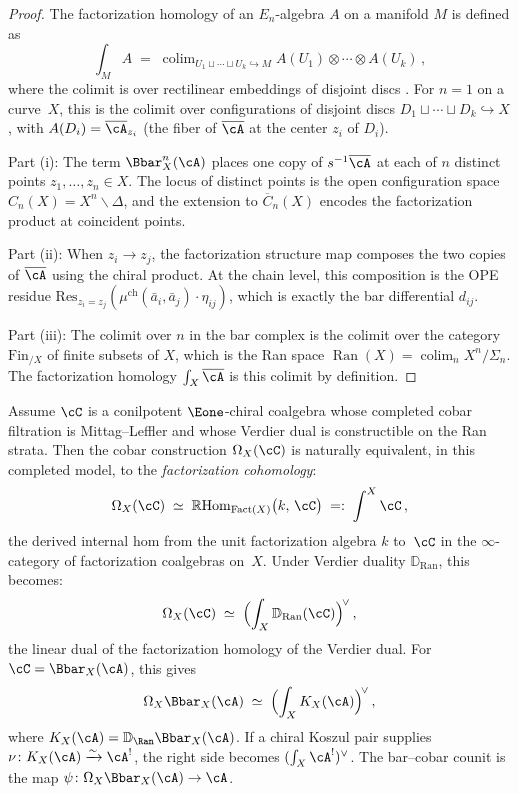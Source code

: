 \begin{proof}
The factorization homology of an $E_n$-algebra $A$ on a manifold
$M$ is defined as
\[
\textstyle\int_M A \;=\; \operatorname{colim}_{U_1 \sqcup \cdots
\sqcup U_k \hookrightarrow M} A(U_1) \otimes \cdots
\otimes A(U_k)\,,
\]
where the colimit is over rectilinear embeddings of disjoint discs
\cite[Definition~3.1]{AF15}. For $n = 1$ on a curve~$X$, this is
the colimit over configurations of disjoint discs
$D_1 \sqcup \cdots \sqcup D_k \hookrightarrow X$, with
$A(D_i) = \overline{\cA}_{z_i}$ (the fiber of $\overline{\cA}$
at the center $z_i$ of $D_i$).

Part (i): The term $\Bbar^n_X(\cA)$ places one copy of
$s^{-1}\overline{\cA}$ at each of $n$ distinct points
$z_1, \ldots, z_n \in X$. The locus of distinct points is the
open configuration space $C_n(X) = X^n \smallsetminus \Delta$,
and the extension to $\overline{C}_n(X)$ encodes the factorization
product at coincident points.

Part (ii): When $z_i \to z_j$, the factorization structure map
composes the two copies of $\overline{\cA}$ using the chiral
product. At the chain level, this composition is the OPE residue
$\mathrm{Res}_{z_i = z_j}(\mu^{\mathrm{ch}}(\bar{a}_i, \bar{a}_j)
\cdot \eta_{ij})$, which is exactly the bar differential $d_{ij}$.

Part (iii): The colimit over $n$ in the bar complex is the colimit
over the category $\mathrm{Fin}_{/X}$ of finite subsets of $X$,
which is the Ran space $\operatorname{Ran}(X) =
\operatorname{colim}_n X^n/\Sigma_n$. The factorization homology
$\int_X\overline{\cA}$ is this colimit by definition.
\end{proof}

\begin{proposition}
\label{prop:cobar-fh}
Assume $\cC$ is a conilpotent $\Eone$-chiral coalgebra whose
completed cobar filtration is Mittag--Leffler and whose Verdier dual
is constructible on the Ran strata. Then the cobar construction
$\Omega_X(\cC)$ is naturally equivalent, in this completed model, to
the
\emph{factorization cohomology}:
\[
\Omega_X(\cC) \;\simeq\;
\mathbb{R}\mathrm{Hom}_{\operatorname{Fact}(X)}
\bigl(k,\, \cC\bigr)
\;=:\;
\int^X \cC\,,
\]
the derived internal hom from the unit factorization algebra $k$
to~$\cC$ in the $\infty$-category of factorization coalgebras on~$X$.
Under Verdier duality $\mathbb{D}_{\mathrm{Ran}}$, this becomes:
\[
\Omega_X(\cC)
\;\simeq\;
\Bigl(\int_X \mathbb{D}_{\mathrm{Ran}}(\cC)\Bigr)^{\!\vee}\,,
\]
the linear dual of the factorization homology of the Verdier dual.
For $\cC = \Bbar_X(\cA)$, this gives
\[
\Omega_X\Bbar_X(\cA) \;\simeq\;
\Bigl(\int_X K_X(\cA)\Bigr)^{\!\vee}\,,
\]
where $K_X(\cA)=\mathbb D_{\Ran}\Bbar_X(\cA)$.  If a chiral Koszul
pair supplies $\nu\colon K_X(\cA)\xrightarrow{\sim}\cA^!$, the right
side becomes $(\int_X\cA^!)^\vee$.  The bar--cobar counit is the map
$\psi\colon\Omega_X\Bbar_X(\cA)\to\cA$.
\end{proposition}


